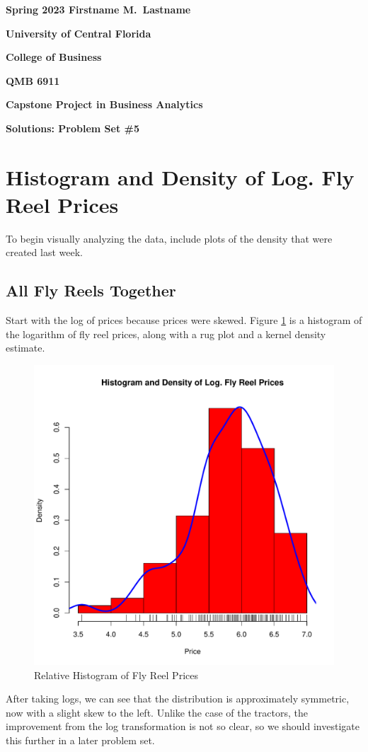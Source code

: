 \documentclass[11pt]{book}
\begin{document}

\pagestyle{empty}
{\noindent\bf Spring 2023 \hfill Firstname M.~Lastname}
\vskip 16pt
\centerline{\bf University of Central Florida}
\centerline{\bf College of Business}
\vskip 16pt
\centerline{\bf QMB 6911}
\centerline{\bf Capstone Project in Business Analytics}
\vskip 10pt
\centerline{\bf Solutions:  Problem Set \#5}
\vskip 32pt
\noindent




\section{Histogram and Density of Log. Fly Reel Prices}

To begin visually analyzing the data, 
include plots of the density that were created last week.

\subsection{All Fly Reels Together}

Start with the log of prices because prices were skewed.
Figure \ref{fig:hist_dens_log_price} is
a histogram of the logarithm of fly reel prices, 
along with a rug plot and a kernel density estimate. 
%
\begin{figure}[h!]
  \centering
  \includegraphics[scale = 0.5, keepaspectratio=true]{../Figures/hist_dens_log_price}
  \caption{Relative Histogram of Fly Reel Prices} \label{fig:hist_dens_log_price}
\end{figure}
% 
After taking logs, we can see that the distribution is
approximately symmetric, now with a slight skew to the left. 
Unlike the case of the tractors, 
the improvement from the log transformation is not so clear, 
so we should investigate this further in a later problem set. 
\end{document}
